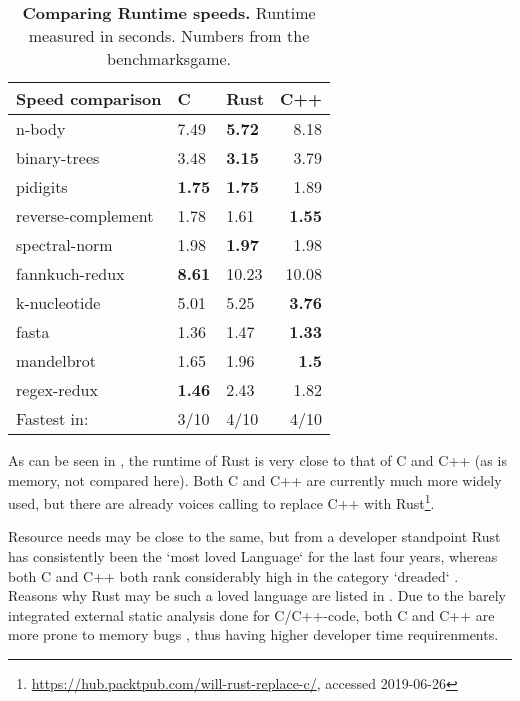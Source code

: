 \begin{table}[ht]
\begin{tabular}{@{}lllr@{}}
    \textbf{Speed comparison} & C & Rust & C++ \\ \midrule
    n-body & 7.49 & \textbf{5.72} & 8.18 \\
    binary-trees & 3.48 & \textbf{3.15} & 3.79 \\
    pidigits & \textbf{1.75} & \textbf{1.75} & 1.89 \\
    reverse-complement & 1.78 & 1.61 & \textbf{1.55} \\
    spectral-norm & 1.98 & \textbf{1.97} & 1.98 \\
    fannkuch-redux & \textbf{8.61} & 10.23 & 10.08 \\
    k-nucleotide & 5.01 & 5.25 & \textbf{3.76} \\
    fasta & 1.36 & 1.47 & \textbf{1.33} \\
    mandelbrot & 1.65 & 1.96 & \textbf{1.5} \\
    regex-redux & \textbf{1.46} & 2.43 & 1.82 \\ \midrule
    Fastest in: & 3/10 & 4/10 & 4/10 \\
\end{tabular}
    \caption[Runtime Comparison Between Rust/C/C++]{\textbf{Comparing Runtime speeds.} Runtime measured in seconds. Numbers from the benchmarksgame\footnotemark.}
    \label{tab:runtime}
\end{table}


As can be seen in , the runtime of Rust is very close to
that of C and C++ (as is memory, not compared here). Both C and C++ are
currently much more widely used, but there are already voices calling to
replace C++ with
Rust\footnote{\url{https://hub.packtpub.com/will-rust-replace-c/}, accessed
2019-06-26}.


Resource needs may be close to the same, but from a developer standpoint Rust
has consistently been the `most loved Language` \cite{rustloved} for the last
four years, whereas both C and C++ both rank considerably high in the category
`dreaded` \cite{rustloved}. Reasons why Rust may be such a loved language are
listed in . Due to the barely integrated external
static analysis done for C/C++-code, both C and C++ are more prone to memory
bugs \cite{pronememory}, thus having higher developer time requirenments.





